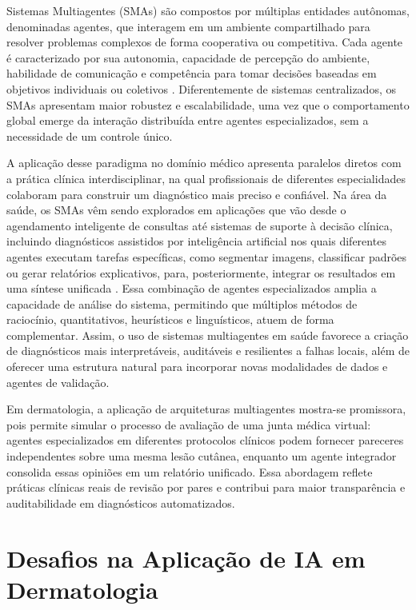 Sistemas Multiagentes (SMAs) são compostos por múltiplas entidades autônomas, denominadas agentes, que interagem em um ambiente compartilhado para resolver problemas complexos de forma cooperativa ou competitiva. Cada agente é caracterizado por sua autonomia, capacidade de percepção do ambiente, habilidade de comunicação e competência para tomar decisões baseadas em objetivos individuais ou coletivos \cite{wooldridge2009introduction}. Diferentemente de sistemas centralizados, os SMAs apresentam maior robustez e escalabilidade, uma vez que o comportamento global emerge da interação distribuída entre agentes especializados, sem a necessidade de um controle único.

A aplicação desse paradigma no domínio médico apresenta paralelos diretos com a prática clínica interdisciplinar, na qual profissionais de diferentes especialidades colaboram para construir um diagnóstico mais preciso e confiável. Na área da saúde, os SMAs vêm sendo explorados em aplicações que vão desde o agendamento inteligente de consultas até sistemas de suporte à decisão clínica, incluindo diagnósticos assistidos por inteligência artificial nos quais diferentes agentes executam tarefas específicas, como segmentar imagens, classificar padrões ou gerar relatórios explicativos, para, posteriormente, integrar os resultados em uma síntese unificada \cite{ke2024mitigating}. Essa combinação de agentes especializados amplia a capacidade de análise do sistema, permitindo que múltiplos métodos de raciocínio,  quantitativos, heurísticos e linguísticos,  atuem de forma complementar. Assim, o uso de sistemas multiagentes em saúde favorece a criação de diagnósticos mais interpretáveis, auditáveis e resilientes a falhas locais, além de oferecer uma estrutura natural para incorporar novas modalidades de dados e agentes de validação.

Em dermatologia, a aplicação de arquiteturas multiagentes mostra-se promissora, pois permite simular o processo de avaliação de uma junta médica virtual: agentes especializados em diferentes protocolos clínicos podem fornecer pareceres independentes sobre uma mesma lesão cutânea, enquanto um agente integrador consolida essas opiniões em um relatório unificado. Essa abordagem reflete práticas clínicas reais de revisão por pares e contribui para maior transparência e auditabilidade em diagnósticos automatizados.


\section{Desafios na Aplicação de IA em Dermatologia}

